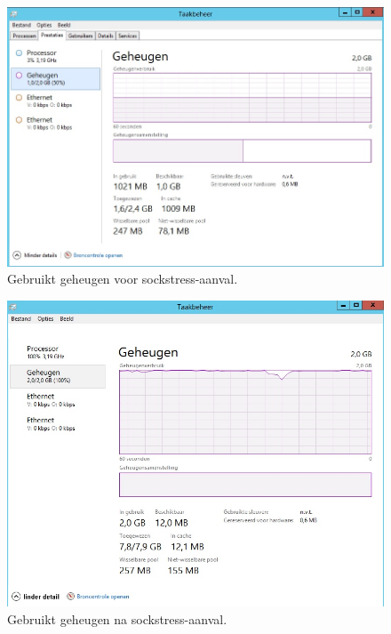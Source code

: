 \documentclass[pdftex,a4paper,12pt]{report}
\begin{document}
\begin{figure}[H]
\begin{center}
\includegraphics[scale=0.50]{img/SockVoor}
\end{center}
\caption{Gebruikt geheugen voor sockstress-aanval.}
\label{img:SockVoor}
\end{figure}

\begin{figure}[H]
\begin{center}
\includegraphics[scale=0.50]{img/SockNa}
\end{center}
\caption{Gebruikt geheugen na sockstress-aanval.}
\label{img:SockNa}
\end{figure}
\end{document}
